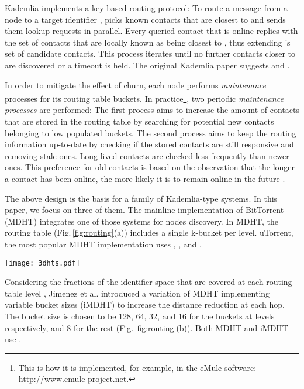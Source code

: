 \documentclass[10pt, conference, compsocconf, letterpaper]{IEEEtran}
\begin{document}
Kademlia implements a key-based routing protocol: To route a message from a node  to a target identifier ,  picks  known contacts that are closest to  and sends them lookup requests in parallel. Every queried contact that is online replies with the set of  contacts that are locally known as being closest to , thus extending 's set of candidate contacts. This process iterates until no further contacts closer to  are discovered or a timeout is held. The original Kademlia paper suggests  and .

In order to mitigate the effect of churn, each node performs \emph{maintenance} processes for its routing table buckets. In practice\footnote{This is how it is implemented, for example, in the eMule software: http://www.emule-project.net.}, two periodic \emph{maintenance processes} are performed: The first process aims to increase the amount of contacts that are stored in the routing table by searching for potential new contacts belonging to low populated buckets. The second process aims to keep the routing information up-to-date by checking if the stored contacts are still responsive and removing stale ones. Long-lived contacts are checked less frequently than newer ones. This preference for old contacts is based on the observation that the longer a contact has been online, the more likely it is to remain online in the future \cite{saroiu01measur, Maymounkov02Kademlia}. 

The above design is the basis for a family of Kademlia-type systems. In this paper, we focus on three of them.  The mainline implementation of BitTorrent (MDHT) integrates one of those systems for nodes discovery. In MDHT, the routing table (Fig.\,\ref{fig:routing}(a)) includes a single k-bucket per level. uTorrent, the most popular MDHT implementation uses , , and  \cite{Jimenez2011subsecond}. 

\begin{figure*} \centering
\captionsetup{font=scriptsize}
      \texttt{[image: 3dhts.pdf]}
   \caption{The routing table structures of three Kademlia-type systems (adapted from: \cite{wang08attacking}): (a) MDHT, (b) iMDHT, and (c) KAD.}
\label{fig:routing}
\end{figure*} 

Considering the fractions of the identifier space that are covered at each routing table level , Jimenez et al. \cite{Jimenez2011subsecond} introduced a variation of MDHT implementing variable bucket sizes (iMDHT) to increase the distance reduction at each hop. The bucket size is chosen to be 128, 64, 32, and 16 for the buckets at levels  respectively, and 8 for the rest (Fig.\,\ref{fig:routing}(b)). Both MDHT and iMDHT use .
\end{document}
